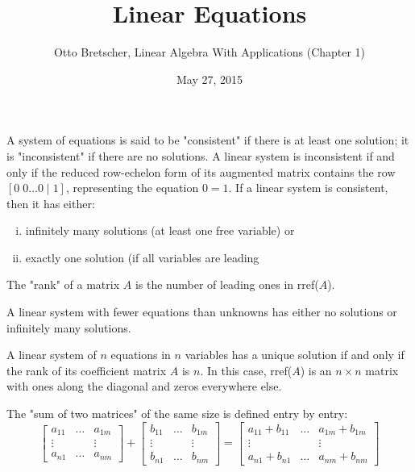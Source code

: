 \documentclass[a4paper,11pt]{article}
\title{Linear Equations}
\author{Otto Bretscher, Linear Algebra With Applications (Chapter 1)}
\date{May 27, 2015}
\begin{document}
\maketitle
{}

\begin{outline}

    A system of equations is said to be "consistent" if there is at least one solution; it is "inconsistent" 
    if there are no solutions. A linear system is inconsistent if and only if the reduced row-echelon form
    of its augmented matrix contains the row \([0\; 0 \ldots 0\; \vert\; 1]\), representing the equation \(0 = 1\). 
    If a linear system is consistent, then it has either:
    \begin{enumerate}[i.]
      \item infinitely many solutions (at least one free variable) or
      \item exactly one solution (if all variables are leading
    \end{enumerate}
    
    The "rank" of a matrix \(A\) is the number of leading ones in rref(\(A\)).
    
    A linear system with fewer equations than unknowns has either no solutions or infinitely many solutions.

    A linear system of \(n\) equations in \(n\) variables has a unique solution if and only if the rank of its 
    coefficient matrix \(A\) is \(n\). In this case, rref(\(A\)) is an \(n \times n\) matrix with ones along the 
    diagonal and zeros everywhere else.
      
    The "sum of two matrices" of the same size is defined entry by entry:
    \[
      \begin{bmatrix} a_{11} & \ldots & a_{1m} \\ \vdots & & \vdots \\ a_{n1} & \ldots & a_{nm} \end{bmatrix} +
      \begin{bmatrix} b_{11} & \ldots & b_{1m} \\ \vdots & & \vdots \\ b_{n1} & \ldots & b_{nm} \end{bmatrix} =
      \begin{bmatrix}
        a_{11} + b_{11} & \ldots & a_{1m} + b_{1m} \\
        \vdots          &        & \vdots          \\
        a_{n1} + b_{n1} & \ldots & a_{nm} + b_{nm} 
      \end{bmatrix}
    \]
      

\end{outline}
\end{document}
